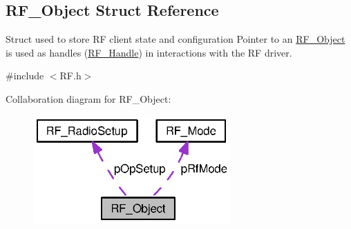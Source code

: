 \subsection{R\+F\+\_\+\+Object Struct Reference}
\label{struct_r_f___object}


Struct used to store R\+F client state and configuration Pointer to an \hyperlink{struct_r_f___object}{R\+F\+\_\+\+Object} is used as handles (\hyperlink{_r_f_8h_a5e8ab7fc87fb818f435d9b6226ee573f}{R\+F\+\_\+\+Handle}) in interactions with the R\+F driver.  




{\ttfamily \#include $<$R\+F.\+h$>$}



Collaboration diagram for R\+F\+\_\+\+Object\+:
\nopagebreak
\begin{figure}[H]
\begin{center}
\leavevmode
\includegraphics[width=214pt]{struct_r_f___object__coll__graph}
\end{center}
\end{figure}
